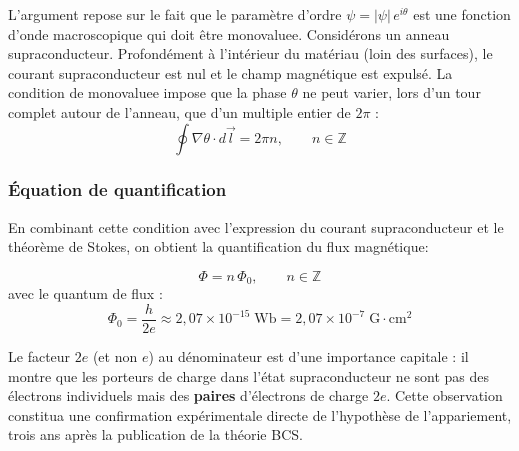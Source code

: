 L'argument repose sur le fait que le param\`etre d'ordre $\psi = |\psi|\,e^{i\theta}$ est une fonction d'onde macroscopique qui doit \^etre monovaluee. Consid\'erons un anneau supraconducteur. Profond\'ement \`a l'int\'erieur du mat\'eriau (loin des surfaces), le courant supraconducteur est nul et le champ magn\'etique est expuls\'e. La condition de monovaluee impose que la phase $\theta$ ne peut varier, lors d'un tour complet autour de l'anneau, que d'un multiple entier de $2\pi$ :
\begin{equation}
    \oint \nabla\theta \cdot d\vec{l} = 2\pi n, \qquad n \in \mathbb{Z}
\end{equation}

\subsubsection{\'Equation de quantification}

En combinant cette condition avec l'expression du courant supraconducteur et le th\'eor\`eme de Stokes, on obtient la quantification du flux magn\'etique:

\begin{equation}
    \Phi = n\,\Phi_0, \qquad n \in \mathbb{Z}
\end{equation}
avec le quantum de flux :
\begin{equation}
    \Phi_0 = \frac{h}{2e} \approx 2{,}07 \times 10^{-15}\;\text{Wb} = 2{,}07 \times 10^{-7}\;\text{G}\cdot\text{cm}^2
\end{equation}

Le facteur $2e$ (et non $e$) au d\'enominateur est d'une importance capitale : il montre que les porteurs de charge dans l'\'etat supraconducteur ne sont pas des \'electrons individuels mais des \textbf{paires} d'\'electrons de charge $2e$. Cette observation constitua une confirmation exp\'erimentale directe de l'hypoth\`ese de l'appariement, trois ans apr\`es la publication de la th\'eorie BCS.


